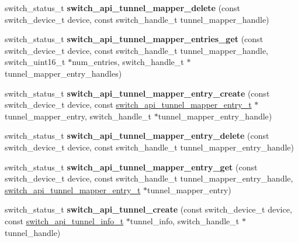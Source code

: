 \begin{DoxyCompactItemize}
\item 
\hypertarget{group__Tunnel_gabf39f5b2f3ed22d07991eedb9cf12678}{switch\+\_\+status\+\_\+t {\bfseries switch\+\_\+api\+\_\+tunnel\+\_\+mapper\+\_\+delete} (const switch\+\_\+device\+\_\+t device, const switch\+\_\+handle\+\_\+t tunnel\+\_\+mapper\+\_\+handle)}\label{group__Tunnel_gabf39f5b2f3ed22d07991eedb9cf12678}

\item 
\hypertarget{group__Tunnel_ga9bdbb33761dd0dadfd0c5fa9b541bccc}{switch\+\_\+status\+\_\+t {\bfseries switch\+\_\+api\+\_\+tunnel\+\_\+mapper\+\_\+entries\+\_\+get} (const switch\+\_\+device\+\_\+t device, const switch\+\_\+handle\+\_\+t tunnel\+\_\+mapper\+\_\+handle, switch\+\_\+uint16\+\_\+t $\ast$num\+\_\+entries, switch\+\_\+handle\+\_\+t $\ast$tunnel\+\_\+mapper\+\_\+entry\+\_\+handles)}\label{group__Tunnel_ga9bdbb33761dd0dadfd0c5fa9b541bccc}

\item 
\hypertarget{group__Tunnel_gad295d08b95f5cd3f733912dc9d06c746}{switch\+\_\+status\+\_\+t {\bfseries switch\+\_\+api\+\_\+tunnel\+\_\+mapper\+\_\+entry\+\_\+create} (const switch\+\_\+device\+\_\+t device, const \hyperlink{group__Tunnel_gadb6058730695240a36e37a65dbc20e8b}{switch\+\_\+api\+\_\+tunnel\+\_\+mapper\+\_\+entry\+\_\+t} $\ast$tunnel\+\_\+mapper\+\_\+entry, switch\+\_\+handle\+\_\+t $\ast$tunnel\+\_\+mapper\+\_\+entry\+\_\+handle)}\label{group__Tunnel_gad295d08b95f5cd3f733912dc9d06c746}

\item 
\hypertarget{group__Tunnel_ga5249e4222be4ac00f8bf41e035c6db57}{switch\+\_\+status\+\_\+t {\bfseries switch\+\_\+api\+\_\+tunnel\+\_\+mapper\+\_\+entry\+\_\+delete} (const switch\+\_\+device\+\_\+t device, const switch\+\_\+handle\+\_\+t tunnel\+\_\+mapper\+\_\+entry\+\_\+handle)}\label{group__Tunnel_ga5249e4222be4ac00f8bf41e035c6db57}

\item 
\hypertarget{group__Tunnel_gaafddf227b57cba2ff4eb5065f38d08c9}{switch\+\_\+status\+\_\+t {\bfseries switch\+\_\+api\+\_\+tunnel\+\_\+mapper\+\_\+entry\+\_\+get} (const switch\+\_\+device\+\_\+t device, const switch\+\_\+handle\+\_\+t tunnel\+\_\+mapper\+\_\+entry\+\_\+handle, \hyperlink{group__Tunnel_gadb6058730695240a36e37a65dbc20e8b}{switch\+\_\+api\+\_\+tunnel\+\_\+mapper\+\_\+entry\+\_\+t} $\ast$tunnel\+\_\+mapper\+\_\+entry)}\label{group__Tunnel_gaafddf227b57cba2ff4eb5065f38d08c9}

\item 
\hypertarget{group__Tunnel_ga7a01d4558a6ee06e18a169717bf68b99}{switch\+\_\+status\+\_\+t {\bfseries switch\+\_\+api\+\_\+tunnel\+\_\+create} (const switch\+\_\+device\+\_\+t device, const \hyperlink{group__Tunnel_ga9c4faabdbd4426a0e9903279ad118116}{switch\+\_\+api\+\_\+tunnel\+\_\+info\+\_\+t} $\ast$tunnel\+\_\+info, switch\+\_\+handle\+\_\+t $\ast$tunnel\+\_\+handle)}\label{group__Tunnel_ga7a01d4558a6ee06e18a169717bf68b99}


\end{DoxyCompactItemize}
